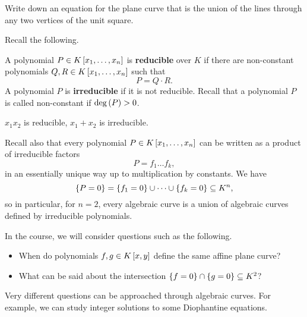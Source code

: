 \begin{exercise}
Write down an equation for the plane curve that is the union of the lines through any two vertices of the unit square.
\end{exercise}

Recall the following.

\begin{definition}
A polynomial $ P \in K\sb{x_1, \dots, x_n} $ is \textbf{reducible} over $ K $ if there are non-constant polynomials $ Q, R \in K\sb{x_1, \dots, x_n} $ such that
$$ P = Q \cdot R. $$
A polynomial $ P $ is \textbf{irreducible} if it is not reducible. Recall that a polynomial $ P $ is called non-constant if $ \deg\rb{P} > 0 $.
\end{definition}

\begin{example*}
$ x_1x_2 $ is reducible, $ x_1 + x_2 $ is irreducible.
\end{example*}

\begin{remark}
Recall also that every polynomial $ P \in K\sb{x_1, \dots, x_n} $ can be written as a product of irreducible factors
$$ P = f_1 \dots f_k, $$
in an essentially unique way up to multiplication by constants. We have
$$ \cb{P = 0} = \cb{f_1 = 0} \cup \dots \cup \cb{f_k = 0} \subseteq K^n, $$
so in particular, for $ n = 2 $, every algebraic curve is a union of algebraic curves defined by irreducible polynomials.
\end{remark}

\pagebreak

In the course, we will consider questions such as the following.
\begin{itemize}
\item When do polynomials $ f, g \in K\sb{x, y} $ define the same affine plane curve?
\item What can be said about the intersection $ \cb{f = 0} \cap \cb{g = 0} \subseteq K^2 $?
\end{itemize}
Very different questions can be approached through algebraic curves. For example, we can study integer solutions to some Diophantine equations.


